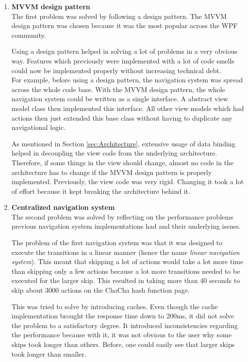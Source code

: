 \begin{enumerate}[label=(\labelenum{S}{{\arabic*}}), wide, labelwidth=!, labelindent=0pt]
\setlength{\parskip}{0pt}

\item \textbf{MVVM design pattern}\\
The first problem was solved by following a design pattern. The MVVM design pattern was chosen because it was the most popular across the WPF community. 

Using a design pattern helped in solving a lot of problems in a very obvious way. Features which previously were implemented with a lot of code smells could now be implemented properly without increasing technical debt. \\
For example, before using a design pattern, the navigation system was spread across the whole code base. With the MVVM design pattern, the whole navigation system could be written as a single interface. A abstract view model class then implemented this interface. All other view models which had actions then just extended this base class without having to duplicate any navigational logic.

As mentioned in Section \ref{sec:Architecture}, extensive usage of data binding helped in decoupling the view code from the underlying architecture. Therefore, if some things in the view should change, almost no code in the architecture has to change if the MVVM design pattern is properly implemented. Previously, the view code was very rigid. Changing it took a lot of effort because it kept breaking the architecture behind it.

\item \textbf{Centralized navigation system}\\
The second problem was solved by reflecting on the performance problems previous navigation system implementations had and their underlying issues.

The problem of the first navigation system was that it was designed to execute the transitions in a linear manner (hence the name \textit{linear navigation system}). This meant that skipping a lot of actions would take a lot more time than skipping only a few actions because a lot more transitions needed to be executed for the larger skip. This resulted in taking more than 40 seconds to skip about 3000 actions on the ChaCha hash function page.

This was tried to solve by introducing caches. Even though the cache implementation brought the response time down to 200ms, it did not solve the problem to a satisfactory degree. It introduced inconsistencies regarding the performance because with it, it was not obvious to the user why some skips took longer than others. Before, one could easily see that larger skips took longer than smaller.


\end{enumerate}
